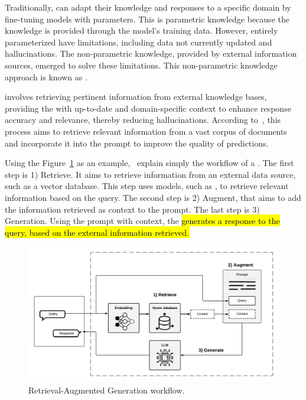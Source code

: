 Traditionally, {\llm} can adapt their knowledge and responses to a specific domain by fine-tuning models with parameters. This is parametric knowledge because the {\llm} knowledge is provided through the model's training data. However, entirely parameterized {\llm} have limitations, including data not currently updated and hallucinations. The non-parametric knowledge, provided by external information sources, emerged to solve these limitations. This non-parametric knowledge approach is known as {\rag}. 

{\rag} involves retrieving pertinent information from external knowledge bases, providing the {\llm} with up-to-date and domain-specific context to enhance response accuracy and relevance, thereby reducing hallucinations. According to~\citet{lewis_retrieval-augmented_2020}, this process aims to retrieve relevant information from a vast corpus of documents and incorporate it into the prompt to improve the quality of predictions.

Using the Figure~\ref{fig_rag} as an example,~\citet{gao_retrieval-augmented_2023} explain simply the workflow of a {\rag}. The first step is 1) Retrieve. It aims to retrieve information from an external data source, such as a vector database. This step uses {\ir} models, such as {\bm}, to retrieve relevant information based on the query. The second step is 2) Augment, that aims to add the information retrieved as context to the {\llm} prompt. The last step is 3) Generation. Using the prompt with context, the {\llm} \hl{generates a response to the query, based on the external information retrieved.}


\begin{figure}[ht]
    \includegraphics[width=\textwidth]{figs/chapter2/rag_workflow.png}
    \centering
    \caption[Retrieval-Augmented Generation workflow]{Retrieval-Augmented Generation workflow.}
    \label{fig_rag}
\end{figure}


